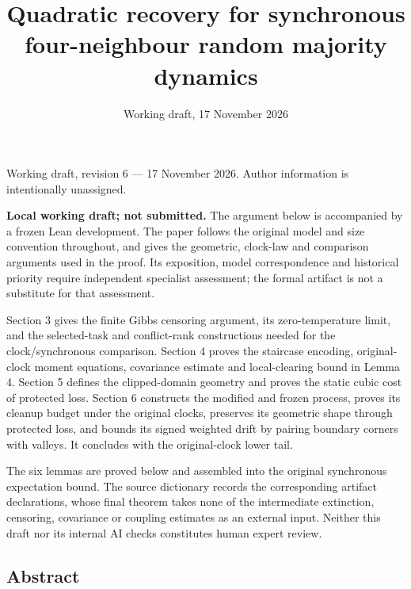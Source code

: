 \documentclass[
  11pt,
  a4paper,
]{article}
\title{Quadratic recovery for synchronous four-neighbour random majority
dynamics}
\author{}
\date{Working draft, 17 November 2026}
\begin{document}
\maketitle

Working draft, revision 6 --- 17 November 2026. Author information is
intentionally unassigned.

\textbf{Local working draft; not submitted.} The argument below is
accompanied by a frozen Lean development. The paper follows the original
model and size convention throughout, and gives the geometric, clock-law
and comparison arguments used in the proof. Its exposition, model
correspondence and historical priority require independent specialist
assessment; the formal artifact is not a substitute for that assessment.

Section 3 gives the finite Gibbs censoring argument, its
zero-temperature limit, and the selected-task and conflict-rank
constructions needed for the clock/synchronous comparison. Section 4
proves the staircase encoding, original-clock moment equations,
covariance estimate and local-clearing bound in Lemma 4. Section 5
defines the clipped-domain geometry and proves the static cubic cost of
protected loss. Section 6 constructs the modified and frozen process,
proves its cleanup budget under the original clocks, preserves its
geometric shape through protected loss, and bounds its signed weighted
drift by pairing boundary corners with valleys. It concludes with the
original-clock lower tail.

The six lemmas are proved below and assembled into the original
synchronous expectation bound. The source dictionary records the
corresponding artifact declarations, whose final theorem takes none of
the intermediate extinction, censoring, covariance or coupling estimates
as an external input. Neither this draft nor its internal AI checks
constitutes human expert review.

\subsection{Abstract}\label{abstract}
\end{document}
